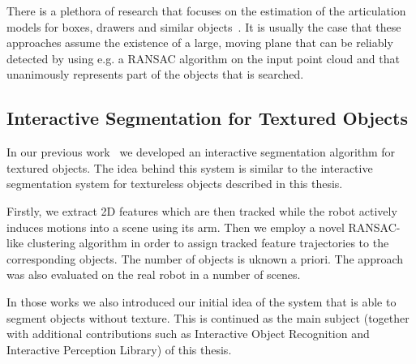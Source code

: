 There is a plethora of research that focuses on the estimation of the articulation models for boxes, drawers and similar objects~\cite{Box11Saxena,
  sturm10rss-workshop}. It is usually the case that these approaches assume the existence of a large, moving plane that can be reliably detected by using e.g. a RANSAC algorithm on the input point cloud and that  unanimously represents part of the objects that is searched.


\subsection{Interactive Segmentation for Textured Objects}
In our previous work~\cite{polishthesis,bersch12interactive} we developed an interactive segmentation algorithm for textured objects. The idea behind this system is similar to the interactive segmentation system for textureless objects described in this thesis.

Firstly, we extract 2D features which are then tracked while the robot actively induces
motions into a scene using its arm. Then we employ a novel RANSAC-like clustering algorithm in order to assign tracked feature trajectories to the corresponding objects. The number of objects is uknown a priori. The approach was also evaluated on the real robot in a number of scenes.

In those works we also introduced our initial idea of the system that is able to segment objects without texture. This is continued as the main subject (together with additional contributions such as Interactive Object Recognition and Interactive Perception Library) of this thesis.  

